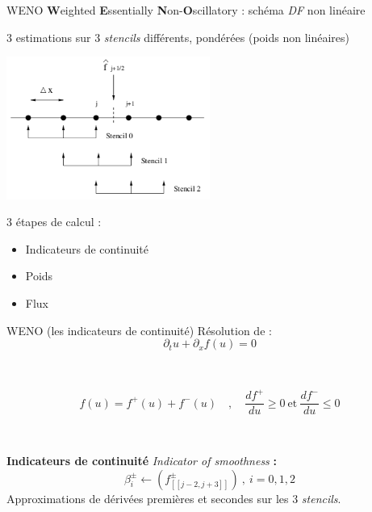 \documentclass{beamer}
\begin{document}
\begin{frame}{WENO}
  \textbf{W}eighted \textbf{E}ssentially \textbf{N}on-\textbf{O}scillatory : schéma \emph{DF} non linéaire

  3 estimations sur 3 \emph{stencils} différents, pondérées (poids non linéaires)

  \begin{center}
    \includegraphics[width=0.5\textwidth]{stencils.png}
  \end{center}

  3 étapes de calcul : \begin{itemize}\item Indicateurs de continuité \item Poids \item Flux \end{itemize}
\end{frame}

\begin{frame}{WENO (les indicateurs de continuité)}
  Résolution de : $$
    \partial_t u + \partial_xf(u) = 0
  $$

  \ 

  $$
    f(u) = f^+(u) + f^-(u)\quad,\quad \frac{df^+}{du}\geq 0\ \text{et}\ \frac{df^-}{du}\leq 0
  $$

  \ 

  \textbf{Indicateurs de continuité} \emph{Indicator of smoothness} \textbf{:}
  $$
      \beta_i^\pm  \gets (f^\pm_{[\![j-2,j+3]\!]})\ ,\ i=0,1,2
  $$
  Approximations de dérivées premières et secondes sur les 3 \emph{stencils}.
\end{frame}
\end{document}
